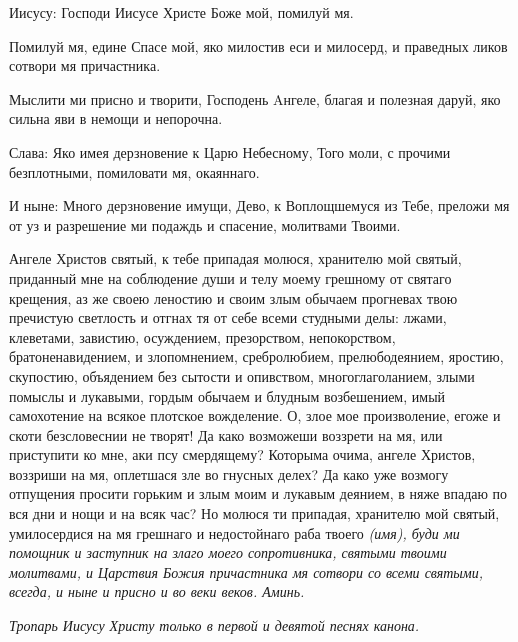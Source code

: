   Иисусу: Господи Иисусе Христе Боже мой, помилуй мя.


  Помилуй мя, едине Спасе мой, яко милостив еси и милосерд, и праведных ликов сотвори мя причастника.


  Мыслити ми присно и творити, Господень Aнгеле, благая и полезная даруй, яко сильна яви в немощи и непорочна.


  Слава: Яко имея дерзновение к Царю Небесному, Того моли, с прочими безплотными, помиловати мя, окаяннаго.


  И ныне: Много дерзновение имущи, Дево, к Воплощшемуся из Тебе, преложи мя от уз и разрешение ми подаждь и спасение, молитвами Твоими.




\medskip





  Ангеле Христов святый, к тебе припадая молюся, хранителю мой святый, приданный мне на соблюдение души и телу моему грешному от святаго крещения, аз же своею леностию и своим злым обычаем прогневах твою пречистую светлость и отгнах тя от себе всеми студными делы: лжами, клеветами, завистию, осуждением, презорством, непокорством, братоненавидением, и злопомнением, сребролюбием, прелюбодеянием, яростию, скупостию, объядением без сытости и опивством, многоглаголанием, злыми помыслы и лукавыми, гордым обычаем и блудным возбешением, имый самохотение на всякое плотское вожделение. О, злое мое произволение, егоже и скоти безсловеснии не творят! Да како возможеши воззрети на мя, или приступити ко мне, аки псу смердящему? Которыма очима, ангеле Христов, воззриши на мя, оплетшася зле во гнусных делех? Да како уже возмогу отпущения просити горьким и злым моим и лукавым деянием, в няже впадаю по вся дни и нощи и на всяк час? Но молюся ти припадая, хранителю мой святый, умилосердися на мя грешнаго и недостойнаго раба твоего \itshape (имя)\normalfont{}, буди ми помощник и заступник на злаго моего сопротивника, святыми твоими молитвами, и Царствия Божия причастника мя сотвори со всеми святыми, всегда, и ныне и присно и во веки веков. Аминь.




\itshape * Тропарь Иисусу Христу только в первой и девятой песнях канона.\normalfont{} 

\mychapterending

 


